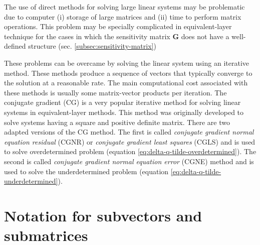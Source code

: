 The use of direct methods for solving large linear systems may be problematic due to computer 
(i) storage of large matrices and (ii) time to perform matrix operations.
This problem may be specially complicated in equivalent-layer technique for the cases in which 
the sensitivity matrix $\mathbf{G}$ does not have a well-defined structure (sec. \ref{subsec:sensitivity-matrix})

These problems can be overcame by solving the linear system using an iterative method.
These methods produce a sequence of vectors that typically converge to the solution at a
reasonable rate. The main computational cost associated with these methods is usually some matrix-vector products 
per iteration.
The conjugate gradient (CG) is a very popular iterative method for solving linear systems in equivalent-layer methods.
This method was originally developed to solve systems having a square and positive definite matrix.
There are two adapted versions of the CG method. The first is called \textit{conjugate gradient normal equation residual} (CGNR) 
\citet[][sec. 11.3]{golub-vanloan2013} or \textit{conjugate gradient least squares} (CGLS) \cite[][p. 165]{aster_etal2019} and is
used to solve overdetermined problem (equation \ref{eq:delta-q-tilde-overdetermined}). 
The second is called \textit{conjugate gradient normal equation error} (CGNE) method 
\citet[][sec. 11.3]{golub-vanloan2013} and is used to solve the underdetermined problem (equation \ref{eq:delta-q-tilde-underdetermined}).


\section{Notation for subvectors and submatrices}

